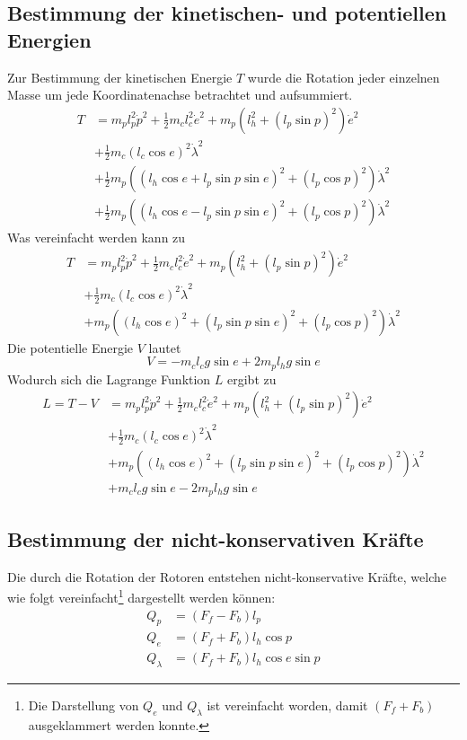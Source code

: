 \documentclass{article}
\begin{document}
	\subsection{Bestimmung der kinetischen- und potentiellen Energien}
	Zur Bestimmung der kinetischen Energie $T$ wurde die Rotation jeder einzelnen Masse um jede Koordinatenachse betrachtet und aufsummiert.
	\begin{equation}
	\begin{split}
	T&= m_p l_p^2\dot{p}^2 + \frac{1}{2}m_cl_c^2\dot{e}^2 
	+ m_p(l_h^2+(l_p\sin p)^2)\dot{e}^2\\
	&+ \frac{1}{2} m_c (l_c \cos e)^2\dot{\lambda}^2\\
	&+ \frac{1}{2} m_p((l_h \cos e +l_p \sin p \sin e)^2+(l_p \cos p)^2)\dot{\lambda}^2\\
	&+ \frac{1}{2} m_p((l_h \cos e -l_p \sin p \sin e)^2+(l_p \cos p)^2)\dot{\lambda}^2
	\end{split}
	\end{equation}
	Was vereinfacht werden kann zu
	\begin{equation}
	\begin{split}
	T&= m_p l_p^2\dot{p}^2 + \frac{1}{2}m_cl_c^2\dot{e}^2 
	+ m_p(l_h^2+(l_p\sin p)^2)\dot{e}^2\\
	&+ \frac{1}{2} m_c (l_c \cos e)^2\dot{\lambda}^2\\
	&+ m_p((l_h \cos e)^2 + (l_p \sin p \sin e)^2+(l_p \cos p)^2)\dot{\lambda}^2
	\end{split}
	\end{equation}
	Die potentielle Energie $V$ lautet
	\begin{equation}
	V = -m_c l_c g \sin e + 2 m_p l_h g \sin e
	\end{equation}
	Wodurch sich die Lagrange Funktion $L$ ergibt zu 
	\begin{equation}
	\begin{split}
	L = T - V&= m_p l_p^2\dot{p}^2 + \frac{1}{2}m_cl_c^2\dot{e}^2 
	+ m_p(l_h^2+(l_p\sin p)^2)\dot{e}^2\\
	&+ \frac{1}{2} m_c (l_c \cos e)^2\dot{\lambda}^2\\
	&+ m_p((l_h \cos e)^2 + (l_p \sin p \sin e)^2+(l_p \cos p)^2)\dot{\lambda}^2\\
	&+ m_c l_c g \sin e - 2 m_p l_h g \sin e
	\end{split}
	\end{equation}
	\subsection{Bestimmung der nicht-konservativen Kräfte}
	Die durch die Rotation der Rotoren entstehen nicht-konservative Kräfte, welche wie folgt vereinfacht\footnote{Die Darstellung von $Q_e$ und $Q_\lambda$ ist vereinfacht worden, damit $(F_f + F_b)$ ausgeklammert werden konnte.} dargestellt werden können:
	\begin{align}
	Q_p &= (F_f - F_b)l_p\\
	Q_e &= (F_f + F_b)l_h  \cos p\\
	Q_\lambda &= (F_f + F_b)l_h \cos e \sin p
	\end{align}
\end{document}
